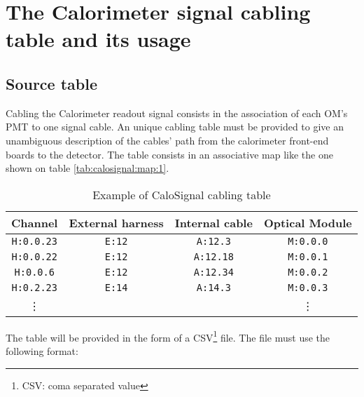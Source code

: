 
\section{The Calorimeter signal cabling table and its usage}

\subsection{Source table}

Cabling the Calorimeter readout signal consists in the association of each OM's PMT to one
signal  cable.  An  unique  cabling  table must  be  provided  to give  an
unambiguous description of the cables' path  from the calorimeter front-end boards to the
detector.  The table consists in an associative map like the one shown
on table \ref{tab:calosignal:map:1}.

\begin{table}[h]
\begin{center}
\begin{tabular}{|c|c|c|c|}
  \hline
  \textbf{Channel}& \textbf{External harness} & \textbf{Internal cable} & \textbf{Optical Module} \\
  \hline
  \hline
  \texttt{H:0.0.23}  & \texttt{E:12} & \texttt{A:12.3} & \texttt{M:0.0.0} \\
  \hline
  \texttt{H:0.0.22}  & \texttt{E:12} & \texttt{A:12.18} & \texttt{M:0.0.1} \\
  \hline
  \texttt{H:0.0.6}  & \texttt{E:12} & \texttt{A:12.34} & \texttt{M:0.0.2} \\
  \hline
  \texttt{H:0.2.23}  & \texttt{E:14} & \texttt{A:14.3} & \texttt{M:0.0.3} \\
  \hline
  \vdots          & & & \vdots             \\  
  \hline
  \hline
\end{tabular}
\end{center}
\caption{Example of CaloSignal cabling table}
\label{tab:calohv:map:1}
\end{table}

\par\noindent  The   table  will  be   provided  in  the  form   of  a
CSV\footnote{CSV: coma  separated value} file.  The file must  use the
following format:

